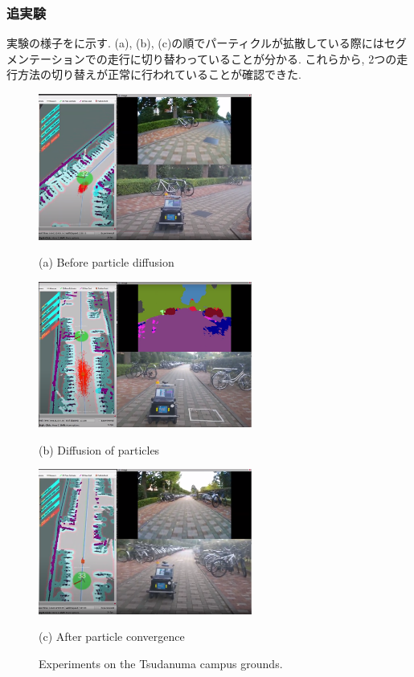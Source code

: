\documentclass[uplatex, twocolumn, 9pt]{jsproceedings}
\begin{document}
\subsubsection{追実験}
実験の様子をに示す. (a), (b), (c)の順でパーティクルが拡散している際にはセグメンテーションでの走行に切り替わっていることが分かる. これらから, 2つの走行方法の切り替えが正常に行われていることが確認できた. 

\begin{figure}[h]
  \centering
  \begin{minipage}[b]{1\linewidth}
    \centering
    \includegraphics[width=70mm]{fig/switch-mode1.pdf}
    \caption*{(a) Before particle diffusion}
  \end{minipage} 
  \hspace{0.03\columnwidth}
  \begin{minipage}[b]{1\linewidth}
    \centering
    \includegraphics[width=70mm]{fig/switch-mode2.pdf}
    \caption*{(b) Diffusion of particles}
  \end{minipage}
  \begin{minipage}[b]{1\linewidth}
    \centering
    \includegraphics[width=70mm]{fig/switch-mode3.pdf}
    \caption*{(c) After particle convergence}
  \end{minipage}
  \caption{Experiments on the Tsudanuma campus grounds.}
  \label{fig:switch-mode}%
\end{figure}
\end{document}
